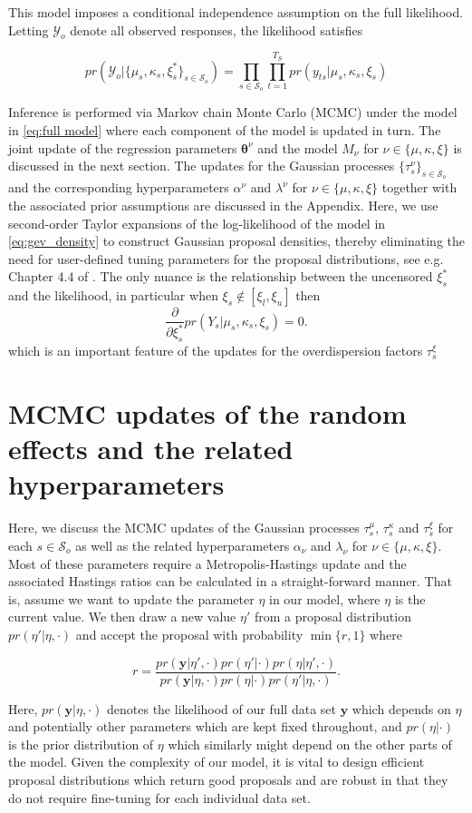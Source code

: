 \documentclass[11pt,english]{article}
\newcommand{\bs}[1]{\boldsymbol{#1}}
\newcommand{\mc}[1]{\mathcal{#1}}
\newcommand{\bl}{\begin{linenomath}}
\newcommand{\el}{\end{linenomath}}
\begin{document}
This model imposes a conditional independence assumption on the full likelihood. Letting $\mathcal{Y}_o$ denote all observed responses, the likelihood satisfies
\bl $$
pr(\mathcal{Y}_o|\{\mu_s,\kappa_s,\xi^{*}_s\}_{s\in\mathcal{S}_o}) = \prod_{s\in\mathcal{S}_o}\prod_{t = 1}^{T_S} pr(y_{ts}|\mu_s,\kappa_s,\xi_s)
$$\el

Inference is performed via Markov chain Monte Carlo (MCMC) under the model in \eqref{eq:full model} where each component of the model is updated in turn.  The joint update of the regression parameters $\bs{\theta}^\nu$ and the model $M_\nu$ for $\nu \in \{ \mu, \kappa, \xi\}$ is discussed in the next section.  The updates for the Gaussian processes $\{ \tau^\nu_s\}_{s \in \mathcal{S}_o}$ and the corresponding hyperparameters $\alpha^{\nu}$ and $\lambda^{\nu}$ for $\nu \in \{ \mu, \kappa, \xi\}$ together with the associated prior assumptions are discussed in the Appendix.  Here, we use second-order Taylor expansions of the log-likelihood of the model in \eqref{eq:gev_density} to construct Gaussian proposal densities, thereby eliminating the need for user-defined tuning parameters for the proposal distributions, see e.g. Chapter 4.4 of \cite{RueHeld2005}. The only nuance is the relationship between the uncensored $\xi^{*}_s$ and the likelihood, in particular when $\xi_s \not\in [\xi_l, \xi_u]$ then
$$
\frac{\partial}{\partial \xi_s^{*}} pr(Y_s|\mu_s, \kappa_s, \xi_s) = 0.
$$
which is an important feature of the updates for the overdispersion factors $\tau_s^{\xi}$

\section{MCMC updates of the random effects and the related hyperparameters}

Here, we discuss the MCMC updates of the Gaussian processes $\tau_s^\mu$, $\tau_s^\kappa$ and $\tau^\xi_s$ for each $s \in \mc{S}_o$ as well as the related hyperparameters $\alpha_\nu$ and $\lambda_\nu$ for $\nu \in \{ \mu, \kappa, \xi \}$. Most of these parameters require a Metropolis-Hastings update and the associated Hastings ratios \citep[e.g.][]{Hoff2009} can be calculated in a straight-forward manner.  That is, assume we want to update the parameter $\eta$ in our model, where $\eta$ is the current value. We then draw a new value $\eta'$ from a proposal distribution $pr(\eta' | \eta, \cdot)$ and accept the proposal with probability $\min \{ r, 1 \}$ where 
\bl\[
r = \frac{pr(\bs{y}| \eta', \cdot) pr(\eta' | \cdot) pr(\eta | \eta', \cdot)}{pr(\bs{y} | \eta, \cdot) pr (\eta| \cdot) pr(\eta' | \eta, \cdot)}.
\]\el
Here, $pr(\bs{y} | \eta, \cdot)$ denotes the likelihood of our full data set $\bs{y}$ which depends on $\eta$ and potentially other parameters which are kept fixed throughout, and $pr( \eta | \cdot)$ is the prior distribution of $\eta$ which similarly might depend on the other parts of the model.  Given the complexity of our model, it is vital to design efficient proposal distributions which return good proposals and are robust in that they do not require fine-tuning for each individual data set.  
\end{document}

